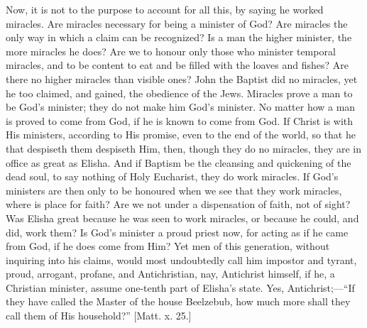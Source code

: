 Now, it is not to the purpose to account for all this, by saying he
worked miracles. Are miracles necessary for being a minister of God?
Are miracles the only way in which a claim can be recognized? Is a man
the higher minister, the more miracles he does? Are we to honour
only those who minister temporal miracles, and to be content to eat
and be filled with the loaves and fishes? Are there no higher miracles
than visible ones? John the Baptist did no miracles, yet he too
claimed, and gained, the obedience of the Jews. Miracles prove a man
to be God's minister; they do not make him God's minister. No matter
how a man is proved to come from God, if he is known to come from God.
If Christ is with His ministers, according to His promise, even to the
end of the world, so that he that despiseth them despiseth Him, then,
though they do no miracles, they are in office as great as Elisha. And
if Baptism be the cleansing and quickening of the dead soul, to say
nothing of Holy Eucharist, they do work miracles. If God's ministers
are then only to be honoured when we see that they work miracles,
where is place for faith? Are we not under a dispensation of faith,
not of sight? Was Elisha great because he was seen to work miracles,
or because he could, and did, work them? Is God's minister a proud
priest now, for acting as if he came from God, if he does come from
Him? Yet men of this generation, without inquiring into his claims,
would most undoubtedly call him impostor and tyrant, proud, arrogant,
profane, and Antichristian, nay, Antichrist himself, if he, a Christian
minister, assume one-tenth part of Elisha's state. Yes, Antichrist;—``If
they have called the Master of the house Beelzebub, how much more
shall they call them of His household?'' [Matt. x. 25.]

